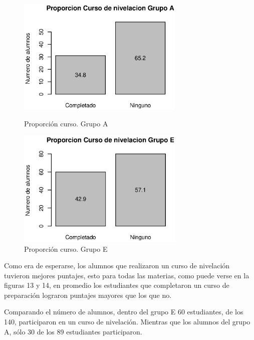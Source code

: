 \documentclass{article}
\begin{document}
    \begin{figure}[ht]
        \begin{minipage}[b]{0.45\linewidth}
            \includegraphics[width=8cm]{Output/Plots/figura9.eps}
            \vspace*{-15mm}
            \caption{Proporci\'on curso. Grupo A}
            \label{fig:minipage1}
        \end{minipage}
        \hspace{0.2cm}
        \begin{minipage}[b]{0.45\linewidth}
            \includegraphics[width=8cm]{Output/Plots/figura10.eps}
            \vspace*{-15mm}
            \caption{Proporci\'on curso. Grupo E}
            \label{fig:minipage2}
        \end{minipage}
    \end{figure}

    Como era de esperarse, los alumnos que realizaron un curso de nivelaci\'on tuvieron mejores puntajes,
    esto para todas las materias, como puede verse en la figuras 13 y 14, en promedio los estudiantes que completaron
    un curso de preparaci\'on lograron puntajes mayores que los que no.

    Comparando el n\'umero de alumnos, dentro del grupo E 60 estudiantes, de los 140, participaron en un curso de nivelaci\'on.
    Mientras que los alumnos del grupo A, s\'olo 30 de los 89 estudiantes participaron.
\end{document}
